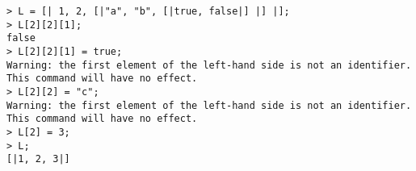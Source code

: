 \begin{center}\begin{minipage}{15cm}\begin{Verbatim}[frame=single]
> L = [| 1, 2, [|"a", "b", [|true, false|] |] |];
> L[2][2][1];
false
> L[2][2][1] = true;
Warning: the first element of the left-hand side is not an identifier.
This command will have no effect.
> L[2][2] = "c";
Warning: the first element of the left-hand side is not an identifier.
This command will have no effect.
> L[2] = 3;
> L;
[|1, 2, 3|]
\end{Verbatim}
\end{minipage}\end{center}
